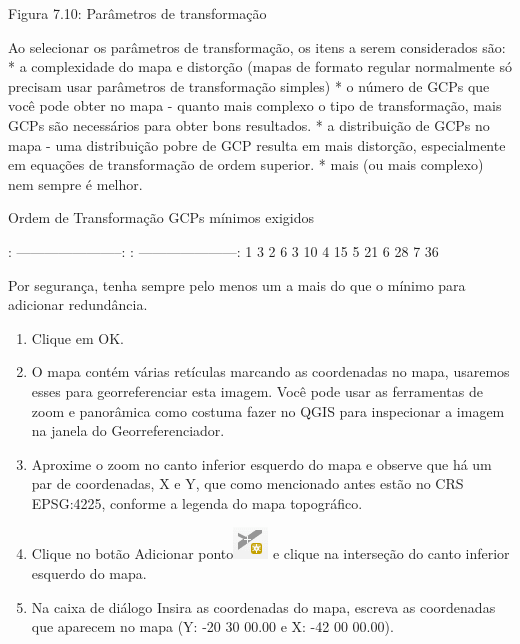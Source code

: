 \documentclass[
]{krantz}
\providecommand{\tightlist}{%
  \setlength{\itemsep}{0pt}\setlength{\parskip}{0pt}}
\begin{document}
Figura 7.10: Parâmetros de transformação

Ao selecionar os parâmetros de transformação, os itens a serem considerados são:
* a complexidade do mapa e distorção (mapas de formato regular normalmente só precisam usar parâmetros de transformação simples)
* o número de GCPs que você pode obter no mapa - quanto mais complexo o tipo de transformação, mais GCPs são necessários para obter bons resultados.
* a distribuição de GCPs no mapa - uma distribuição pobre de GCP resulta em mais distorção, especialmente em equações de transformação de ordem superior.
* mais (ou mais complexo) nem sempre é melhor.

Ordem de Transformação \textbar{} GCPs mínimos exigidos \textbar{}

\textbar: -----------------------: \textbar: ---------------------: \textbar{}
\textbar{} 1 \textbar{} 3 \textbar{}
\textbar{} 2 \textbar{} 6 \textbar{}
\textbar{} 3 \textbar{} 10 \textbar{}
\textbar{} 4 \textbar{} 15 \textbar{}
\textbar{} 5 \textbar{} 21 \textbar{}
\textbar{} 6 \textbar{} 28 \textbar{}
\textbar{} 7 \textbar{} 36 \textbar{}

Por segurança, tenha sempre pelo menos um a mais do que o mínimo para adicionar redundância.

\begin{enumerate}
\def\labelenumi{\arabic{enumi}.}
\setcounter{enumi}{5}
\tightlist
\item
  Clique em OK.
\item
  O mapa contém várias retículas marcando as coordenadas no mapa, usaremos esses para georreferenciar esta imagem. Você pode usar as ferramentas de zoom e panorâmica como costuma fazer no QGIS para inspecionar a imagem na janela do Georreferenciador.
\item
  Aproxime o zoom no canto inferior esquerdo do mapa e observe que há um par de coordenadas, X e Y, que como mencionado antes estão no CRS EPSG:4225, conforme a legenda do mapa topográfico.
\item
  Clique no botão Adicionar ponto\includegraphics{media/modulo7/add-point.png} e clique na interseção do canto inferior esquerdo do mapa.
\item
  Na caixa de diálogo Insira as coordenadas do mapa, escreva as coordenadas que aparecem no mapa (Y: -20 30 00.00 e X: -42 00 00.00).
\end{enumerate}
\end{document}
